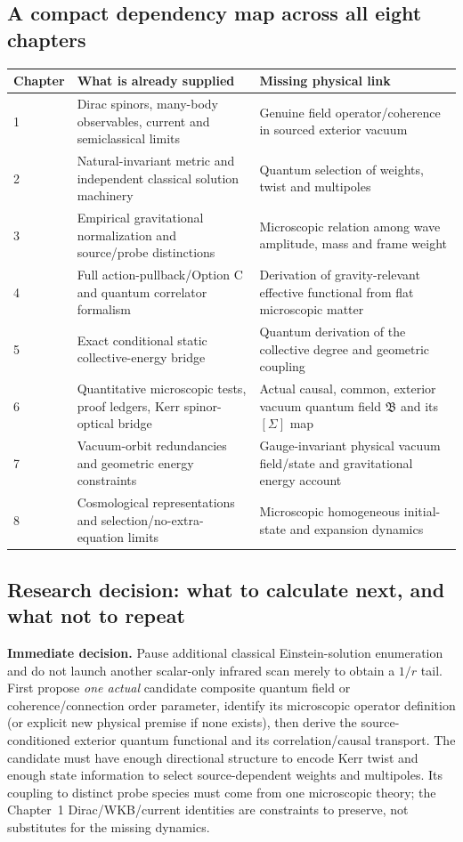 \documentclass[11pt,a4paper]{article}
\begin{document}
\subsection{A compact dependency map across all eight chapters}
\label{sec:v13-chapters}
\begin{center}\small
\begin{tabularx}{\linewidth}{@{}p{.13\linewidth}X X@{}}\toprule
Chapter & What is already supplied & Missing physical link\\\midrule
1 & Dirac spinors, many-body observables, current and semiclassical limits & Genuine field operator/coherence in sourced exterior vacuum\\
2 & Natural-invariant metric and independent classical solution machinery & Quantum selection of weights, twist and multipoles\\
3 & Empirical gravitational normalization and source/probe distinctions & Microscopic relation among wave amplitude, mass and frame weight\\
4 & Full action-pullback/Option C and quantum correlator formalism & Derivation of gravity-relevant effective functional from flat microscopic matter\\
5 & Exact conditional static collective-energy bridge & Quantum derivation of the collective degree and geometric coupling\\
6 & Quantitative microscopic tests, proof ledgers, Kerr spinor-optical bridge & Actual causal, common, exterior vacuum quantum field $\mathfrak B$ and its $[\Sigma]$ map\\
7 & Vacuum-orbit redundancies and geometric energy constraints & Gauge-invariant physical vacuum field/state and gravitational energy account\\
8 & Cosmological representations and selection/no-extra-equation limits & Microscopic homogeneous initial-state and expansion dynamics\\\bottomrule
\end{tabularx}\end{center}

\subsection{Research decision: what to calculate next, and what not to repeat}
\label{sec:v13-research-decision}
\textbf{Immediate decision.} Pause additional classical Einstein-solution enumeration and do not launch another scalar-only infrared scan merely to obtain a $1/r$ tail. First propose \emph{one actual} candidate composite quantum field or coherence/connection order parameter, identify its microscopic operator definition (or explicit new physical premise if none exists), then derive the source-conditioned exterior quantum functional and its correlation/causal transport. The candidate must have enough directional structure to encode Kerr twist and enough state information to select source-dependent weights and multipoles. Its coupling to distinct probe species must come from one microscopic theory; the Chapter~1 Dirac/WKB/current identities are constraints to preserve, not substitutes for the missing dynamics.
\end{document}

